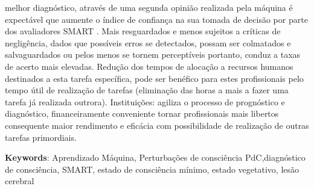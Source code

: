   melhor diagnóstico, através de uma segunda opinião realizada pela máquina é expectável que aumente o índice de confiança na sua tomada de decisão por parte dos avaliadores SMART . Mais resguardados e menos sujeitos a críticas de negligência, dados que possíveis erros se detectados, possam ser colmatados e salvaguardados ou pelos menos se tornem perceptíveis portanto, conduz a taxas de acerto mais elevadas. Redução dos tempos de alocação a recursos humanos destinados a esta tarefa específica, pode ser benéfico para estes profissionais pelo tempo útil de realização de tarefas (eliminação das horas a mais a fazer uma tarefa já realizada outrora). 
Instituições: agiliza o processo de prognóstico e diagnóstico, financeiramente conveniente tornar profissionais mais libertos consequente maior rendimento e eficácia com possibilidade de realização de outras tarefas primordiais.


\vspace*{10mm}\noindent
\textbf{Keywords}: Aprendizado Máquina, Perturbações de consciência PdC,diagnóstico de consciência, SMART, estado de consciência mínimo, estado vegetativo, lesão cerebral
